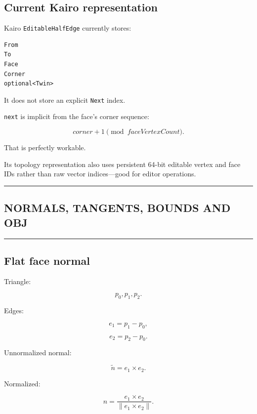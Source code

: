 \subsection{Current Kairo representation}\label{04-visual-computing-ii-ch041-current-kairo-representation}

Kairo \texttt{EditableHalfEdge} currently stores:

\begin{verbatim}
From
To
Face
Corner
optional<Twin>
\end{verbatim}

It does not store an explicit \texttt{Next} index.

\texttt{next} is implicit from the face's corner sequence:

\[
corner+1\pmod{faceVertexCount}.
\]

That is perfectly workable.

Its topology representation also uses persistent 64-bit editable vertex and face IDs rather than raw vector indices---good for editor operations.

\begin{center}\rule{0.5\linewidth}{0.5pt}\end{center}

\subsection{NORMALS, TANGENTS, BOUNDS AND OBJ}\label{04-visual-computing-ii-ch041-normals-tangents-bounds-and-obj}

\begin{center}\rule{0.5\linewidth}{0.5pt}\end{center}

\subsection{Flat face normal}\label{04-visual-computing-ii-ch041-flat-face-normal}

Triangle:

\[
p_0,p_1,p_2.
\]

Edges:

\[
e_1=p_1-p_0,
\]

\[
e_2=p_2-p_0.
\]

Unnormalized normal:

\[
\tilde n=
e_1\times e_2.
\]

Normalized:

\[
\boxed{
n=
\frac{
e_1\times e_2
}{
\|e_1\times e_2\|
}.
}
\]


